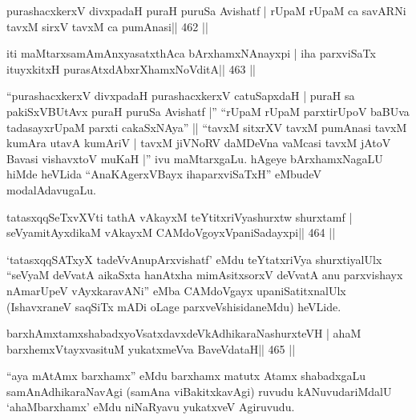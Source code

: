 

\begin{shl}
purashacxkerxV divxpadaH puraH puruSa Avishatf |
rUpaM rUpaM ca savARNi tavxM sirxV tavxM ca pumAnasi\hfill || 462 ||
\end{shl}

\begin{shl}
iti maMtarxsamAmAnxyasatxthAca bArxhamxNAnayxpi |
iha parxviSaTx ituyxkitxH purasAtxdAbxrXhamxNoVditA\hfill || 463 ||
\end{shl}

\begin{artha}
``purashacxkerxV divxpadaH purashacxkerxV catuSapxdaH | puraH sa
  pakiSxVBUtAvx puraH puruSa Avishatf |'' ``rUpaM rUpaM
  parxtirUpoV baBUva tadasayxrUpaM parxti cakaSxNAya'' ||  ``tavxM
  sitxrXV tavxM pumAnasi tavxM kumAra utavA kumAriV | tavxM jiVNoRV
  daMDeVna vaMcasi tavxM jAtoV Bavasi vishavxtoV muKaH |'' ivu
  maMtarxgaLu. hAgeye bArxhamxNagaLU hiMde heVLida ``AnaKAgerxVBayx
  ihaparxviSaTxH'' eMbudeV modalAdavugaLu.
\end{artha}

\begin{shl}
tatasxqqSeTxvXVti tathA vAkayxM teYtitxriVyashurxtw shurxtamf |
seVyamitAyxdikaM vAkayxM CAMdoVgoyxVpaniSadayxpi\hfill || 464 ||
\end{shl}

\begin{artha}
`tatasxqqSATxyX tadeVvAnupArxvishatf' eMdu teYtatxriVya shurxtiyalUlx
  ``seVyaM deVvatA aikaSxta hanAtxha mimAsitxsorxV deVvatA anu
  parxvishayx nAmarUpeV vAyxkaravANi'' eMba CAMdoVgayx
  upaniSatitxnalUlx (IshavxraneV saqSiTx mADi oLage
  parxveVshisidaneMdu) heVLide.
\end{artha}



\begin{shl}
barxhAmxtamxshabadxyoVsatxdavxdeVkAdhikaraNashurxteVH |
ahaM barxhemxVtayxvasituM yukatxmeVva BaveVdataH\hfill || 465 ||
\end{shl}

\begin{artha}
``aya mAtAmx barxhamx'' eMdu barxhamx matutx Atamx shabadxgaLu   samAnAdhikaraNavAgi (samAna viBakitxkavAgi) ruvudu kANuvudariMdalU   `ahaMbarxhamx' eMdu niNaRyavu yukatxveV Agiruvudu.
\end{artha}

